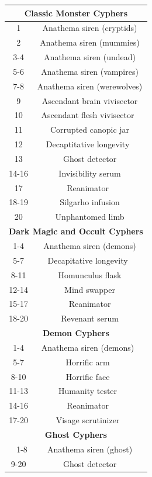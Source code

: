 \begin{longtable}{| c | c |}
\multicolumn{2}{|c|}{\textbf{Classic Monster Cyphers}} \\ \hline
1 & Anathema siren (cryptids) \\ \hline 
2 & Anathema siren (mummies) \\ \hline
3-4 & Anathema siren (undead) \\ \hline
5-6 & Anathema siren (vampires) \\ \hline
7-8 & Anathema siren (werewolves) \\ \hline
9 & Ascendant brain vivisector \\ \hline
10 & Ascendant flesh vivisector  \\ \hline
11 & Corrupted canopic jar \\ \hline
12 & Decaptitative longevity  \\ \hline
13 & Ghost detector \\ \hline
14-16 & Invisibility serum \\ \hline
17 & Reanimator  \\ \hline
18-19 & Silgarho infusion \\ \hline
20 & Unphantomed limb \\ \hline

\multicolumn{2}{|c|}{\textbf{Dark Magic and Occult Cyphers}} \\ \hline
1-4 & Anathema siren (demons) \\ \hline
5-7 & Decapitative longevity  \\ \hline
8-11 & Homunculus flask \\ \hline
12-14 & Mind swapper \\ \hline
15-17 & Reanimator \\ \hline
18-20 & Revenant serum \\ \hline

\multicolumn{2}{|c|}{\textbf{Demon Cyphers}} \\ \hline
1-4 & Anathema siren (demons) \\ \hline
5-7 & Horrific arm \\ \hline
8-10 & Horrific face \\ \hline
11-13 & Humanity tester \\ \hline
14-16 & Reanimator \\ \hline
17-20 & Visage scrutinizer \\ \hline

\multicolumn{2}{|c|}{\textbf{Ghost Cyphers}} \\ \hline 
1-8 & Anathema siren (ghost) \\ \hline
9-20 & Ghost detector \\ \hline


\end{longtable}
